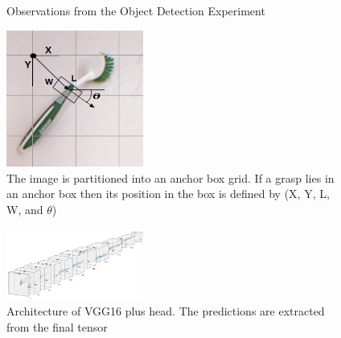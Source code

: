 \documentclass{article}
\begin{document}
\begin{figure}
\centering
{}
\qquad
{}
\caption{Observations from the Object Detection Experiment}
\label{fig:obj_det}
\end{figure}

\begin{figure}
\centering
\includegraphics[width=0.4\textwidth]{figures/example_anchor_box.png}
\caption{The image is partitioned into an anchor box grid. If a grasp lies in an anchor box then its position in the box is defined by (X, Y, L, W, and $\theta$)}
\label{fig:example}
\end{figure}

\begin{figure}
\centering
\includegraphics[width=0.4\textwidth]{figures/nn.png}
\caption{Architecture of VGG16 plus head. The predictions are extracted from the final tensor}
\label{fig:nn}
\end{figure}
\end{document}
